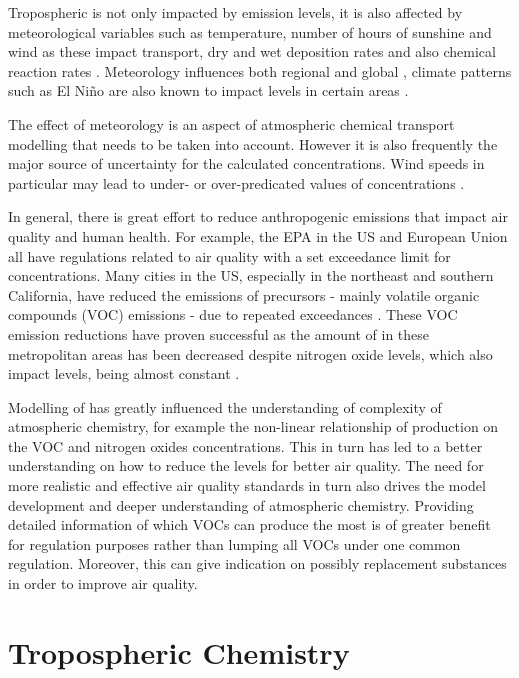 Tropospheric  is not only impacted by emission levels, it is also affected by meteorological variables such as temperature, number of hours of sunshine and wind as these impact transport, dry and wet deposition rates and also chemical reaction rates \citep{Hess:2009}.
Meteorology influences both regional and global  \citep{Hess:2009}, climate patterns such as El Ni\~{n}o are also known to impact  levels in certain areas \citep{Sudo:2001}. 

The effect of meteorology is an aspect of atmospheric chemical transport modelling that needs to be taken into account. 
However it is also frequently the major source of uncertainty for the calculated  concentrations. 
Wind speeds in particular may lead to under- or over-predicated values of  concentrations \citep{Sillman:1999}. 

In general, there is great effort to reduce anthropogenic emissions that impact air quality and human health. 
For example, the EPA in the US and European Union all have regulations related to air quality with a set exceedance limit for  concentrations. 
Many cities in the US, especially in the northeast and southern California, have reduced the emissions of  precursors - mainly volatile organic compounds (VOC) emissions - due to repeated exceedances \citep{Fiore:1998}. 
These VOC emission reductions have proven successful as the amount of  in these metropolitan areas has been decreased despite nitrogen oxide levels, which also impact  levels, being almost constant \citep{Fiore:1998, Lin:2001}.

Modelling of  has greatly influenced the understanding of complexity of atmospheric chemistry, for example the non-linear relationship of  production on the VOC and nitrogen oxides concentrations. 
This in turn has led to a better understanding on how to reduce the  levels for better air quality. 
The need for more realistic and effective air quality standards in turn also drives the model development and deeper understanding of atmospheric chemistry. 
Providing detailed information of which VOCs can produce the most  is of greater benefit for regulation purposes rather than lumping all VOCs under one common regulation. 
Moreover, this can give indication on possibly replacement substances in order to improve air quality.

\section{Tropospheric Chemistry} \label{s:atmo_chem}

